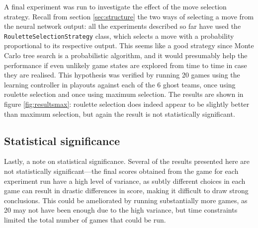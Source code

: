 A final experiment was run to investigate the effect of the move selection strategy.  Recall from section \ref{sec:structure} the two ways of selecting a move from the neural network output: all the experiments described so far have used the {\tt RouletteSelectionStrategy} class, which selects a move with a probability proportional to its respective output.  This seems like a good strategy since Monte Carlo tree search is a probabilistic algorithm, and it would presumably help the performance if even unlikely game states are explored from time to time in case they are realised.  This hypothesis was verified by running 20 games using the learning controller in playouts against each of the 6 ghost teams, once using roulette selection and once using maximum selection.  The results are shown in figure \ref{fig:resultsmax}: roulette selection does indeed appear to be slightly better than maximum selection, but again the result is not statistically significant.

\subsection{Statistical significance}

Lastly, a note on statistical significance.  Several of the results presented here are not statistically significant---the final scores obtained from the game for each experiment run have a high level of variance, as subtly different choices in each game can result in drastic differences in score, making it difficult to draw strong conclusions.  This could be ameliorated by running substantially more games, as 20 may not have been enough due to the high variance, but time constraints limited the total number of games that could be run.


